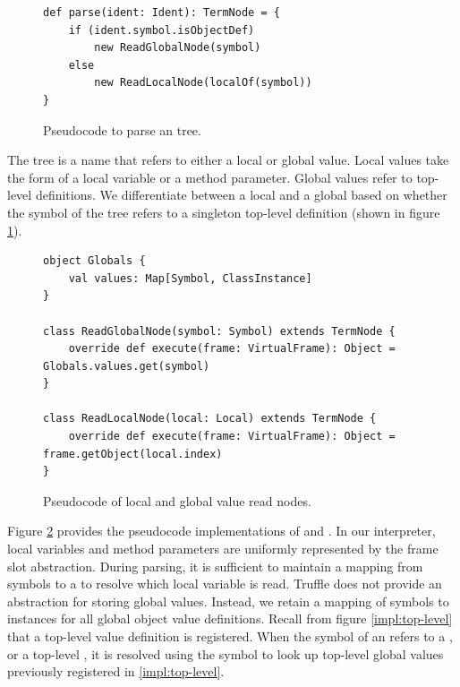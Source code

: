 \begin{figure}[!htb]
\begin{verbatim}
def parse(ident: Ident): TermNode = {
	if (ident.symbol.isObjectDef)
		new ReadGlobalNode(symbol)
	else 
		new ReadLocalNode(localOf(symbol))
}
\end{verbatim}
\caption{Pseudocode to parse an  tree.}
\label{impl:parse-ident}
\end{figure}

The  tree is a name that refers to either a local or global value.
Local values take the form of a local variable or a method parameter.
Global values refer to top-level  definitions.
We differentiate between a local and a global based on whether the symbol of the  tree refers to a singleton top-level  definition (shown in figure \ref{impl:parse-ident}).

\begin{figure}[!htb]
\begin{verbatim}
object Globals {
	val values: Map[Symbol, ClassInstance]
}

class ReadGlobalNode(symbol: Symbol) extends TermNode {
	override def execute(frame: VirtualFrame): Object = Globals.values.get(symbol)
}

class ReadLocalNode(local: Local) extends TermNode {
	override def execute(frame: VirtualFrame): Object = frame.getObject(local.index)
}
\end{verbatim}
\caption{Pseudocode of local and global value read nodes.}
\label{impl:local-global-node}
\end{figure}

Figure \ref{impl:local-global-node} provides the pseudocode implementations of  and .
In our interpreter, local variables and method parameters are uniformly represented by the frame slot abstraction.
During parsing, it is sufficient to maintain a mapping from symbols to a  to resolve which local variable is read.
Truffle does not provide an abstraction for storing global values.
Instead, we retain a mapping of symbols to instances for all global object value definitions.
Recall from figure \ref{impl:top-level} that a top-level value definition is registered.
When the symbol of an  refers to a , or a top-level , it is resolved using the symbol to look up top-level global values previously registered in \ref{impl:top-level}.

